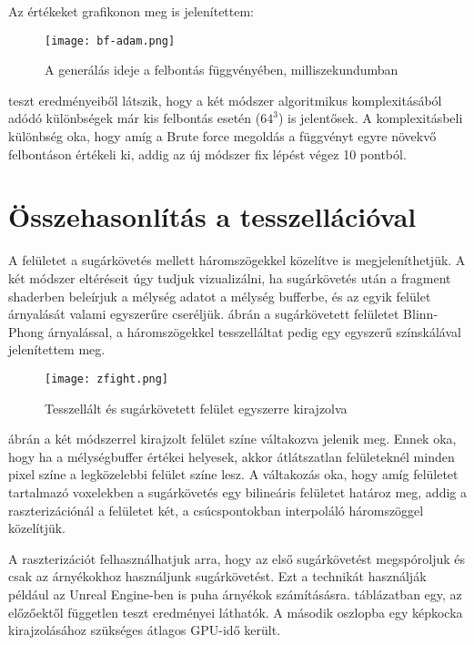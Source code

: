 Az értékeket  grafikonon meg is jelenítettem:

\begin{figure}[H]
	\centering
	\texttt{[image: bf-adam.png]}
	\caption{A generálás ideje a felbontás függvényében, milliszekundumban}
	\label{img:bf-adam}
\end{figure}

 teszt eredményeiből látszik, hogy a két módszer algoritmikus komplexitásából adódó különbségek már kis felbontás esetén ($64^3$) is jelentősek. A komplexitásbeli különbség oka, hogy amíg a Brute force megoldás a függvényt egyre növekvő felbontáson értékeli ki, addig az új módszer fix lépést végez 10 pontból.

\section{Összehasonlítás a tesszellációval}
A felületet a sugárkövetés mellett háromszögekkel közelítve is megjeleníthetjük. A két módszer eltéréseit úgy tudjuk vizualizálni, ha sugárkövetés után a fragment shaderben beleírjuk a mélység adatot a mélység bufferbe, és az egyik felület árnyalását valami egyszerűre cseréljük.  ábrán  a sugárkövetett felületet Blinn-Phong árnyalással, a háromszögekkel tesszelláltat pedig egy egyszerű színskálával jelenítettem meg.

\begin{figure}[H]
	\centering
	\texttt{[image: zfight.png]}
	\caption{Tesszellált és sugárkövetett felület egyszerre kirajzolva}
	\label{img:zfight}
\end{figure}

 ábrán a két módszerrel kirajzolt felület színe váltakozva jelenik meg. Ennek oka, hogy ha a mélységbuffer értékei helyesek, akkor átlátszatlan felületeknél minden pixel színe a legközelebbi felület színe lesz. A váltakozás oka, hogy amíg felületet tartalmazó voxelekben a sugárkövetés egy bilineáris felületet határoz meg, addig a raszterizációnál a felületet két, a csúcspontokban interpoláló háromszöggel közelítjük.

A raszterizációt felhasználhatjuk arra, hogy az első sugárkövetést megspóroljuk és csak az árnyékokhoz használjunk sugárkövetést. Ezt a technikát használják például az Unreal Engine-ben is puha árnyékok számításásra. \cite{RayTracedDistanceFieldShadowing}  táblázatban egy, az előzőektől független teszt eredményei láthatók. A második oszlopba egy képkocka kirajzolásához szükséges átlagos GPU-idő került.

